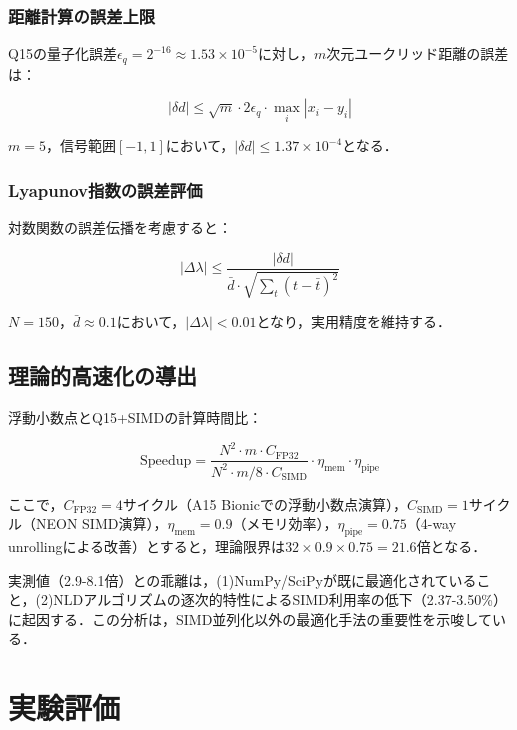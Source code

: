 \documentclass[paper]{ieice}
\begin{document}
\subsubsection{距離計算の誤差上限}
Q15の量子化誤差$\epsilon_q = 2^{-16} \approx 1.53 \times 10^{-5}$に対し，$m$次元ユークリッド距離の誤差は：

\begin{equation}
|\delta d| \leq \sqrt{m} \cdot 2\epsilon_q \cdot \max_i |x_i - y_i|
\end{equation}

$m=5$，信号範囲$[-1,1]$において，$|\delta d| \leq 1.37 \times 10^{-4}$となる．

\subsubsection{Lyapunov指数の誤差評価}
対数関数の誤差伝播を考慮すると：

\begin{equation}
|\Delta\lambda| \leq \frac{|\delta d|}{\bar{d} \cdot \sqrt{\sum_{t}(t - \bar{t})^2}}
\end{equation}

$N=150$，$\bar{d} \approx 0.1$において，$|\Delta\lambda| < 0.01$となり，実用精度を維持する．

\subsection{理論的高速化の導出}

浮動小数点とQ15+SIMDの計算時間比：

\begin{equation}
\text{Speedup} = \frac{N^2 \cdot m \cdot C_{\text{FP32}}}{N^2 \cdot m/8 \cdot C_{\text{SIMD}}} \cdot \eta_{\text{mem}} \cdot \eta_{\text{pipe}}
\end{equation}

ここで，$C_{\text{FP32}} = 4$サイクル（A15 Bionicでの浮動小数点演算），$C_{\text{SIMD}} = 1$サイクル（NEON SIMD演算），$\eta_{\text{mem}} = 0.9$（メモリ効率），$\eta_{\text{pipe}} = 0.75$（4-way unrollingによる改善）とすると，理論限界は$32 \times 0.9 \times 0.75 = 21.6$倍となる．

実測値（2.9-8.1倍）との乖離は，(1)NumPy/SciPyが既に最適化されていること，(2)NLDアルゴリズムの逐次的特性によるSIMD利用率の低下（2.37-3.50\%）に起因する．この分析は，SIMD並列化以外の最適化手法の重要性を示唆している．

\section{実験評価}
\end{document}
